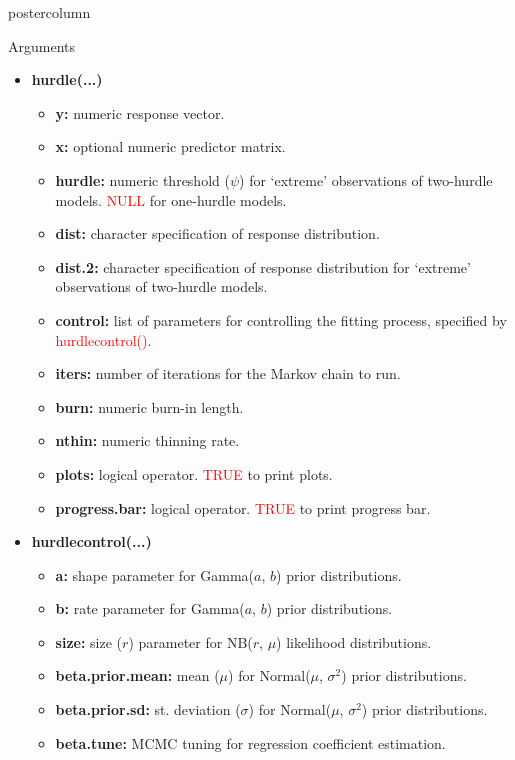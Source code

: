 \documentclass[final]{beamer}\usepackage[]{graphicx}\usepackage[]{color}
\newcommand{\red}{\textcolor{red}}
\begin{document}
{\begin{frame}
\begin{columns}
\begin{column}{.33\textwidth}
\begin{beamercolorbox}[center,wd=\textwidth]{postercolumn}
\begin{minipage}[T]{.97\textwidth}
{\begin{block}{Arguments}
\begin{itemize}
	\item \textbf{hurdle(...)}
	\begin{itemize}\item \textbf{y:} numeric response vector.
		\item \textbf{x:} optional numeric predictor matrix.
		\item \textbf{hurdle:} numeric threshold ($\psi$) for `extreme' observations of two-hurdle models. \red{NULL} for one-hurdle models.
		\item \textbf{dist:} character specification of response distribution.
		\item \textbf{dist.2:} character specification of response distribution for `extreme' observations of two-hurdle models.
		\item \textbf{control:} list of parameters for controlling the fitting process, specified by \red{hurdle\textunderscore control()}.
		\item \textbf{iters:} number of iterations for the Markov chain to run. 
		\item \textbf{burn:} numeric burn-in length.
		\item \textbf{nthin:} numeric thinning rate.
		\item \textbf{plots:} logical operator. \red{TRUE} to print plots. 
		\item \textbf{progress.bar:} logical operator. \red{TRUE} to print progress bar. 
	\end{itemize}
	\begin{center}
		\vspace{-0.5cm}
	\end{center}
	\item \textbf{hurdle\textunderscore control(...)}
	\begin{itemize}
		\item \textbf{a:} shape parameter for Gamma($a$, $b$) prior distributions.
		\item \textbf{b:} rate parameter for Gamma($a$, $b$) prior distributions.
		\item \textbf{size:} size ($r$) parameter for NB($r$, $\mu$) likelihood distributions.
		\item \textbf{beta.prior.mean:} mean ($\mu$) for Normal($\mu$, $\sigma^{2}$) prior distributions.
		\item \textbf{beta.prior.sd:} st. deviation ($\sigma$) for Normal($\mu$, $\sigma^{2}$) prior distributions.
		\item \textbf{beta.tune:} MCMC tuning for regression coefficient estimation.

\end{itemize}
\end{itemize}
\end{block}}
\end{minipage}
\end{beamercolorbox}
\end{column}
\end{columns}
\end{frame}}
\end{document}
